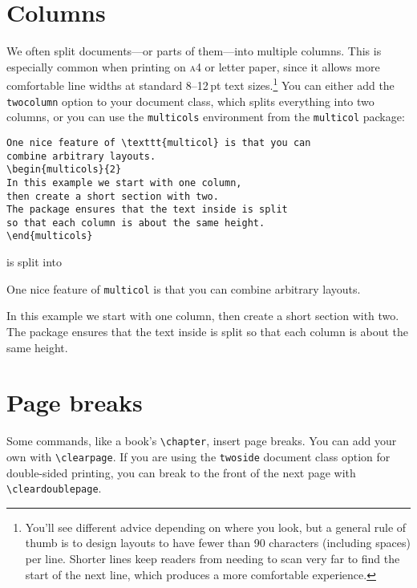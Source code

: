\section{Columns}

We often split documents---or parts of them---into multiple columns.
This is especially common when printing on \textsc{a4} or  letter
paper, since it allows more comfortable line widths at standard
8--12\,pt text sizes.\punckern\footnote{You'll see different advice depending
on where you look, but a general rule of thumb is to design layouts to have
fewer than 90 characters (including spaces) per line.
Shorter lines keep readers from needing to scan very far to find the start of
the next line,
which produces a more comfortable experience.}
You can either add the \texttt{twocolumn} option to your document class,
which splits everything into two columns, or you can use the \texttt{multicols}
environment from the \texttt{multicol} package:
\begin{leftfigure}
\begin{lstlisting}
One nice feature of \texttt{multicol} is that you can
combine arbitrary layouts.
\begin{multicols}{2}
In this example we start with one column,
then create a short section with two.
The package ensures that the text inside is split
so that each column is about the same height.
\end{multicols}
\end{lstlisting}
\end{leftfigure}
is split into
\begin{leftfigure}
\lm%
One nice feature of \texttt{multicol} is that you can
combine arbitrary layouts.
\begin{multicols}{2}
In this example we start with one column,
then create a short section with two.
The package ensures that the text inside is split
so that each column is about the same height.
\end{multicols}
\end{leftfigure}

\section{Page breaks}

Some commands, like a book's \verb|\chapter|, insert page breaks.
You can add your own with \verb|\clearpage|.
If you are using the \texttt{twoside} document class option for double-sided
printing, you can break to the front of the next page with
\verb|\cleardoublepage|.

